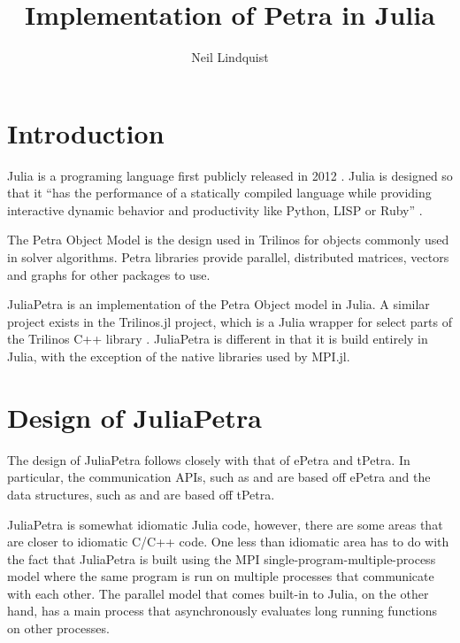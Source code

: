 \documentclass{article}
\title{Implementation of Petra in Julia}
\author{Neil Lindquist}
\newcommand{\juliaSnippet}[1]{\texttt{\detokenize{#1}}}
\begin{document}
\maketitle

\section{Introduction}

Julia is a programing language first publicly released in 2012 \cite{WhyWeCreatedJulia}.
Julia is designed so that it
``has the performance of a statically compiled
language while providing interactive dynamic behavior and productivity like Python, LISP or
Ruby'' \cite{JuliaDesignPaper}.

The Petra Object Model is the design used in Trilinos for objects commonly used in solver algorithms.
\cite{OverviewOfTrilinos}
Petra libraries provide parallel, distributed matrices, vectors and graphs for other packages to use.

JuliaPetra is an implementation of the Petra Object model in Julia.
A similar project exists in the Trilinos.jl project, which is a Julia wrapper for select parts of
the Trilinos C++ library \cite{Trilinos.jlGithub}.
JuliaPetra is different in that it is build entirely in Julia, with the exception of the
native libraries used by MPI.jl.


\section{Design of JuliaPetra}

The design of JuliaPetra follows closely with that of ePetra and tPetra.
In particular, the communication APIs, such as \juliaSnippet{Comm} and \juliaSnippet{BlockMap}
are based off ePetra and the data structures, such as \juliaSnippet{MultiVector} and
\juliaSnippet{RowMatrix} are based off tPetra.


JuliaPetra is somewhat idiomatic Julia code, however, there are some areas that are closer to
idiomatic C/C++ code.
One less than idiomatic area has to do with the fact that JuliaPetra is built using the MPI
single-program-multiple-process model where the same program is run on multiple processes
that communicate with each other.
The parallel model that comes built-in to Julia, on the other hand, has a main process that
asynchronously evaluates long running functions on other processes.  \cite{JuliaFreshApproach}
\end{document}
